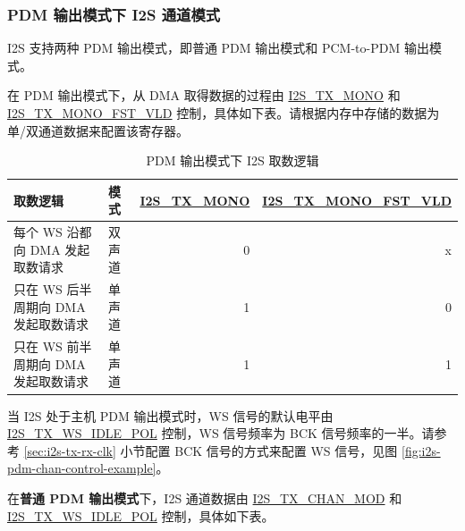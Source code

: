 \documentclass[main\_\_CN.tex]{subfiles}
\begin{document}
\subsubsection{PDM 输出模式下 I2S 通道模式} 

\chipname{} I2S 支持两种 PDM 输出模式，即普通 PDM 输出模式和 PCM-to-PDM 输出模式。

在 PDM 输出模式下，从 DMA 取得数据的过程由 \hyperref[fielddesc:I2STXMONO]{I2S\_TX\_MONO} 和 \hyperref[fielddesc:I2STXMONOFSTVLD]{I2S\_TX\_MONO\_FST\_VLD} 控制，具体如下表。请根据内存中存储的数据为单/双通道数据来配置该寄存器。

\begin{table}[H]
    \centering
    \caption{PDM 输出模式下 I2S 取数逻辑}
    \label{tab:i2s-data-fetch-control-pdm-mode}
    \begin{tabular}{|p{6.6cm}|l|r|r|}
    \hline
    \rowcolor{lightgray}
    \textbf{取数逻辑} &\textbf{模式} &\textbf{\hyperref[fielddesc:I2STXMONO]{I2S\_TX\_MONO}}  & \textbf{\hyperref[fielddesc:I2STXMONOFSTVLD]{I2S\_TX\_MONO\_FST\_VLD}} \\ \hline
                        每个 WS 沿都向 DMA 发起取数请求 & 双声道 & 0 & x        \\ \hline
                        只在 WS 后半周期向 DMA 发起取数请求  & 单声道 & 1 & 0   \\ \hline
                        只在 WS 前半周期向 DMA 发起取数请求 & 单声道 & 1 & 1      \\ \hline
    \end{tabular}
\end{table}

当 I2S 处于主机 PDM 输出模式时，WS 信号的默认电平由 \hyperref[fielddesc:I2STXWSIDLEPOL]{I2S\_TX\_WS\_IDLE\_POL} 控制，WS 信号频率为 BCK 信号频率的一半。请参考 \ref{sec:i2s-tx-rx-clk} 小节配置 BCK 信号的方式来配置 WS 信号，见图
\ref{fig:i2s-pdm-chan-control-example}。

在\textbf{普通 PDM 输出模式}下，I2S 通道数据由 \hyperref[fielddesc:I2Ssec:i2s-tx-dataMOD]{I2S\_TX\_CHAN\_MOD} 和 \hyperref[fielddesc:I2STXWSIDLEPOL]{I2S\_TX\_WS\_IDLE\_POL} 控制，具体如下表。
\end{document}
